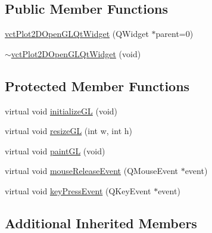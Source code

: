 \subsection*{Public Member Functions}
\begin{DoxyCompactItemize}
\item 
\hyperlink{classvct_plot2_d_open_g_l_qt_widget_a81449d7daf75fd115b3accb2b0be8e9e}{vct\-Plot2\-D\-Open\-G\-L\-Qt\-Widget} (Q\-Widget $\ast$parent=0)
\item 
\hyperlink{classvct_plot2_d_open_g_l_qt_widget_a01f9799efb902dff5d30b88ae5bb0d7c}{$\sim$vct\-Plot2\-D\-Open\-G\-L\-Qt\-Widget} (void)
\end{DoxyCompactItemize}
\subsection*{Protected Member Functions}
{\bf }\par
\begin{DoxyCompactItemize}
\item 
virtual void \hyperlink{classvct_plot2_d_open_g_l_qt_widget_ad220c52212210335c217804a2a9704e6}{initialize\-G\-L} (void)
\item 
virtual void \hyperlink{classvct_plot2_d_open_g_l_qt_widget_a6004ed472a5f8395171f9a32ec0010ec}{resize\-G\-L} (int w, int h)
\item 
virtual void \hyperlink{classvct_plot2_d_open_g_l_qt_widget_ad8638def4a77f3024e07ff6b1aad3485}{paint\-G\-L} (void)
\item 
virtual void \hyperlink{classvct_plot2_d_open_g_l_qt_widget_a9608618db7a9ac70533ae240b1abb776}{mouse\-Release\-Event} (Q\-Mouse\-Event $\ast$event)
\item 
virtual void \hyperlink{classvct_plot2_d_open_g_l_qt_widget_a451c4a3661a0196ceb11997a27d42ff3}{key\-Press\-Event} (Q\-Key\-Event $\ast$event)
\end{DoxyCompactItemize}

\subsection*{Additional Inherited Members}


